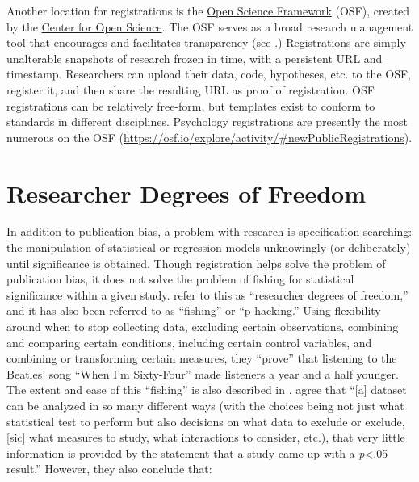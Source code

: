 \documentclass[12pt] {article}
\begin{document}
Another location for registrations is the \href{http://osf.io}{Open Science Framework} (OSF), created by the \href{http://centerforopenscience.org/}{Center for Open Science}. The OSF serves as a broad research management tool that encourages and facilitates transparency (see \cite{nosek_scientific_2012}.) Registrations are simply unalterable snapshots of research frozen in time, with a persistent URL and timestamp. Researchers can upload their data, code, hypotheses, etc. to the OSF, register it, and then share the resulting URL as proof of registration. OSF registrations can be relatively free-form, but templates exist to conform to standards in different disciplines. Psychology registrations are presently the most numerous on the OSF (\hyperref[newPublicRegistrations]{https://osf.io/explore/activity/\#newPublicRegistrations}).

\section{Researcher Degrees of
Freedom}\label{rdof}

In addition to publication bias, a problem with research is
specification searching: the manipulation of statistical or regression
models unknowingly (or deliberately) until significance is obtained.
Though registration helps solve the problem of publication bias, it does
not solve the problem of fishing for statistical significance within a
given study. \cite{simmons_false-positive_2011} refer to this as
``researcher degrees of freedom,'' and it has also been referred to as
``fishing'' or ``p-hacking.'' Using flexibility around when to stop
collecting data, excluding certain observations, combining and comparing
certain conditions, including certain control variables, and combining
or transforming certain measures, they ``prove'' that listening to the
Beatles' song ``When I'm Sixty-Four'' made listeners a year and a half
younger. The extent and ease of this ``fishing'' is also described in
\cite{humphreys_fishing_2013}. \cite{gelman_garden_2013} agree that
``{[}a{]} dataset can be analyzed in so many different ways (with the
choices being not just what statistical test to perform but also
decisions on what data to exclude or exclude, {[}sic{]} what measures to
study, what interactions to consider, etc.), that very little
information is provided by the statement that a study came up with a
\emph{p}\textless{}.05 result.'' However, they also conclude that:
\end{document}

